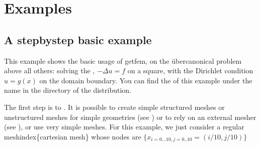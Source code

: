 \documentclass[a4paper,11pt,english]{sphinxmanual}
\begin{document}
\chapter{Examples}
\label{\detokenize{python/examples:examples}}\label{\detokenize{python/examples:py-examples}}\label{\detokenize{python/examples::doc}}

\section{A step\sphinxhyphen{}by\sphinxhyphen{}step basic example}
\label{\detokenize{python/examples:a-step-by-step-basic-example}}\label{\detokenize{python/examples:py-laplacianexample}}
This example shows the basic usage of getfem, on the über\sphinxhyphen{}canonical problem above
all others: solving the , \(-\Delta u = f\) on a square,
with the Dirichlet condition \(u = g(x)\) on the domain boundary. You can find
the  of this example under the name  in the
directory  of the  distribution.

The first step is to . It is possible to create simple structured meshes or unstructured meshes for simple geometries (see ) or to rely on an external mesher (see ), or use very simple meshes. For this example,
we just consider a regular meshindex\{cartesian mesh\} whose nodes are
\(\{x_{i=0\ldots10,j=0..10}=(i/10,j/10)\}\)

\begin{sphinxVerbatim}[commandchars=\\\{\},numbers=left,firstnumber=1,stepnumber=1]
   

   

\end{sphinxVerbatim}
\end{document}
